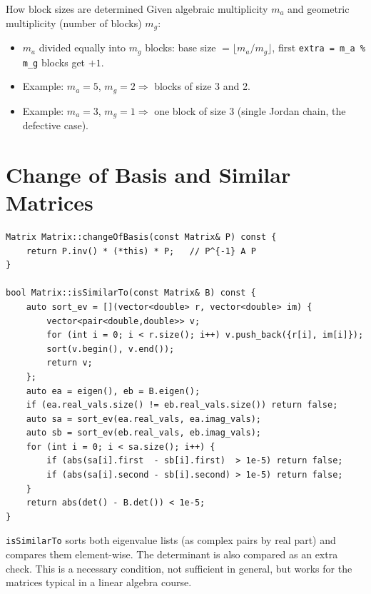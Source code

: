 \documentclass[12pt, a4paper]{article}
\newcommand{\code}[1]{\texttt{\small#1}}
\newcommand{\fn}[1]{\texttt{\small\color{funcgreen}#1}}
\begin{document}
\begin{notebox}{How block sizes are determined}
Given algebraic multiplicity $m_a$ and geometric multiplicity (number of blocks)
$m_g$:
\begin{itemize}[noitemsep]
  \item $m_a$ divided equally into $m_g$ blocks: base size $= \lfloor m_a /
        m_g \rfloor$, first \code{extra = m\_a \% m\_g} blocks get $+1$.
  \item Example: $m_a = 5$, $m_g = 2 \Rightarrow$ blocks of size 3 and 2.
  \item Example: $m_a = 3$, $m_g = 1 \Rightarrow$ one block of size 3 (single
        Jordan chain, the defective case).
\end{itemize}
\end{notebox}

\section{Change of Basis and Similar Matrices}

\begin{lstlisting}
Matrix Matrix::changeOfBasis(const Matrix& P) const {
    return P.inv() * (*this) * P;   // P^{-1} A P
}

bool Matrix::isSimilarTo(const Matrix& B) const {
    auto sort_ev = [](vector<double> r, vector<double> im) {
        vector<pair<double,double>> v;
        for (int i = 0; i < r.size(); i++) v.push_back({r[i], im[i]});
        sort(v.begin(), v.end());
        return v;
    };
    auto ea = eigen(), eb = B.eigen();
    if (ea.real_vals.size() != eb.real_vals.size()) return false;
    auto sa = sort_ev(ea.real_vals, ea.imag_vals);
    auto sb = sort_ev(eb.real_vals, eb.imag_vals);
    for (int i = 0; i < sa.size(); i++) {
        if (abs(sa[i].first  - sb[i].first)  > 1e-5) return false;
        if (abs(sa[i].second - sb[i].second) > 1e-5) return false;
    }
    return abs(det() - B.det()) < 1e-5;
}
\end{lstlisting}

\fn{isSimilarTo} sorts both eigenvalue lists (as complex pairs by real part)
and compares them element-wise.  The determinant is also compared as an extra
check.  This is a necessary condition, not sufficient in general, but works
for the matrices typical in a linear algebra course.
\end{document}
